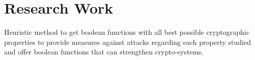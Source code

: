 \documentclass[10pt]{article} %
\begin{document}

\section{Research Work}

{
Heuristic method to get boolean functions with all best possible cryptographic properties to provide measures against attacks regarding each property studied and offer boolean functions that can strengthen crypto-systems.
}

\end{document}
